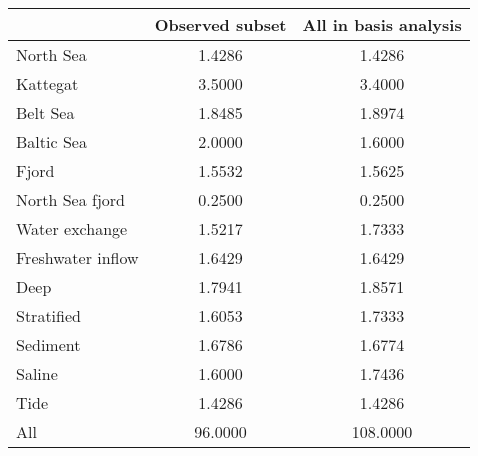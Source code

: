 \begin{tabular}{lcc}
\toprule
 & Observed subset & All in basis analysis \\
\midrule
North Sea & 1.4286 & 1.4286 \\
Kattegat & 3.5000 & 3.4000 \\
Belt Sea & 1.8485 & 1.8974 \\
Baltic Sea & 2.0000 & 1.6000 \\
Fjord & 1.5532 & 1.5625 \\
North Sea fjord & 0.2500 & 0.2500 \\
Water exchange & 1.5217 & 1.7333 \\
Freshwater inflow & 1.6429 & 1.6429 \\
Deep & 1.7941 & 1.8571 \\
Stratified & 1.6053 & 1.7333 \\
Sediment & 1.6786 & 1.6774 \\
Saline & 1.6000 & 1.7436 \\
Tide & 1.4286 & 1.4286 \\
All & 96.0000 & 108.0000 \\
\bottomrule
\end{tabular}
